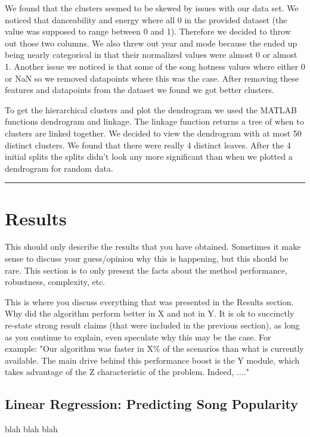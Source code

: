 \documentclass[12pt]{article}
\newcommand{\horizontalLine}{
	\begin{center}
		\hrule width 1.0\textwidth
	\end{center}
}
\begin{document}
We found that the clusters seemed to be skewed by issues with our data set. We noticed that danceability and energy where all 0 in the provided dataset (the value was supposed to range between 0 and 1). Therefore we decided to throw out those two columns. We also threw out year and mode because the ended up being nearly categorical in that their normalized values were almost 0 or almost 1. Another issue we noticed is that some of the song hotness values where either 0 or NaN so we removed datapoints where this was the case. After removing these features and datapoints from the dataset we found we got better clusters.

To get the hierarchical clusters and plot the dendrogram we used the MATLAB functions dendrogram and linkage. The linkage function returns a tree of when to clusters are linked together. We decided to view the dendrogram with at most 50 distinct clusters. We found that there were really 4 distinct leaves. After the 4 initial splits the splits didn't look any more significant than when we plotted a dendrogram for random data. 

\horizontalLine
\section{Results}
\label{sec:results}

This should only describe the results that you have obtained. Sometimes it make sense
to discuss your guess/opinion why this is happening, but this should be rare. This section is to
only present the facts about the method performance, robustness, complexity, etc.

This is where you discuss everything that was presented in the Results section.
Why did the algorithm perform better in X and not in Y. It is ok to succinctly re-state strong
result claims (that were included in the previous section), as long as you continue to explain,
even speculate why this may be the case. For example: "Our algorithm was faster in X\% of the
scenarios than what is currently available. The main drive behind this performance boost is the
Y module, which takes advantage of the Z characteristic of the problem. Indeed, ...."

\subsection{Linear Regression: Predicting Song Popularity}
\label{subsec:linearRegressionResults}
blah blah blah
\end{document}
